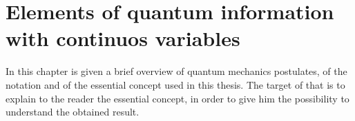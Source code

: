 \chapter[Continuos Variables States]{Elements of quantum information with continuos variables}
    In this chapter is given a brief overview of quantum mechanics postulates,
    of the notation and of the essential concept used in this thesis. 
    The target of that is to explain to the reader the essential concept, in 
    order to give him the possibility to understand the obtained result.

    



    
    
    

    

